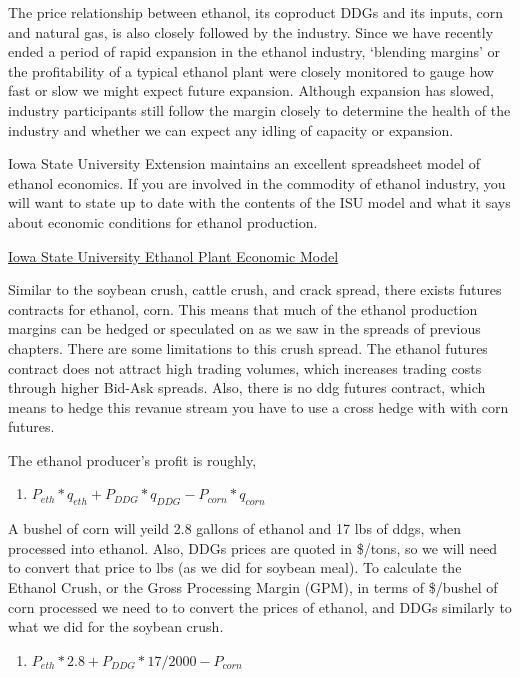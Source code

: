\documentclass[
  letterpaper,
  DIV=11,
  numbers=noendperiod]{scrreprt}
\providecommand{\tightlist}{%
  \setlength{\itemsep}{0pt}\setlength{\parskip}{0pt}}\usepackage{longtable,booktabs,array}
\begin{document}
The price relationship between ethanol, its coproduct DDGs and its
inputs, corn and natural gas, is also closely followed by the industry.
Since we have recently ended a period of rapid expansion in the ethanol
industry, `blending margins' or the profitability of a typical ethanol
plant were closely monitored to gauge how fast or slow we might expect
future expansion. Although expansion has slowed, industry participants
still follow the margin closely to determine the health of the industry
and whether we can expect any idling of capacity or expansion.

Iowa State University Extension maintains an excellent spreadsheet model
of ethanol economics. If you are involved in the commodity of ethanol
industry, you will want to state up to date with the contents of the ISU
model and what it says about economic conditions for ethanol production.

\href{https://www.extension.iastate.edu/agdm/articles/hof/HofJan08.html}{Iowa
State University Ethanol Plant Economic Model}

Similar to the soybean crush, cattle crush, and crack spread, there
exists futures contracts for ethanol, corn. This means that much of the
ethanol production margins can be hedged or speculated on as we saw in
the spreads of previous chapters. There are some limitations to this
crush spread. The ethanol futures contract does not attract high trading
volumes, which increases trading costs through higher Bid-Ask spreads.
Also, there is no ddg futures contract, which means to hedge this
revanue stream you have to use a cross hedge with with corn futures.

The ethanol producer's profit is roughly,

\begin{enumerate}
\def\labelenumi{\arabic{enumi}.}
\tightlist
\item
  \(P_{eth}*q_{eth} + P_{DDG}*q_{DDG} - P_{corn}*q_{corn}\)
\end{enumerate}

A bushel of corn will yeild 2.8 gallons of ethanol and 17 lbs of ddgs,
when processed into ethanol. Also, DDGs prices are quoted in \$/tons, so
we will need to convert that price to lbs (as we did for soybean meal).
To calculate the Ethanol Crush, or the Gross Processing Margin (GPM), in
terms of \$/bushel of corn processed we need to to convert the prices of
ethanol, and DDGs similarly to what we did for the soybean crush.

\begin{enumerate}
\def\labelenumi{\arabic{enumi}.}
\setcounter{enumi}{1}
\tightlist
\item
  \(P_{eth}*2.8 + P_{DDG}*17/2000 - P_{corn}\)
\end{enumerate}
\end{document}
